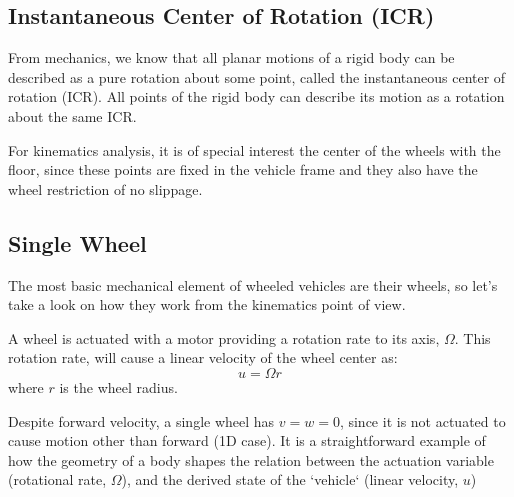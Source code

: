 \subsection{Instantaneous Center of Rotation (ICR)}
From mechanics, we know that all planar motions of a rigid body can be described as a pure rotation about some point, called the instantaneous center of rotation (ICR). All points of the rigid body can describe its motion as a rotation about the same ICR. 

For kinematics analysis, it is of special interest the center of the wheels with the floor, since these points are fixed in the vehicle frame and they also have the wheel restriction of no slippage. 


\subsection{Single Wheel}
The most basic mechanical element of wheeled vehicles are their wheels, so let's take a look on how they work from the kinematics point of view.

A wheel is actuated with a motor providing a rotation rate to its axis, $\Omega$. This rotation rate, will cause a linear velocity of the wheel center as: 
\begin{equation}
 u = \Omega r
\end{equation}
where $r$ is the wheel radius. 

Despite forward velocity, a single wheel has $v = w = 0$, since it is not actuated to cause motion other than forward (1D case). It is a straightforward example of how the geometry of a body shapes the relation between the actuation variable (rotational rate, $\Omega$), and the derived state of the `vehicle` (linear velocity, $u$)


